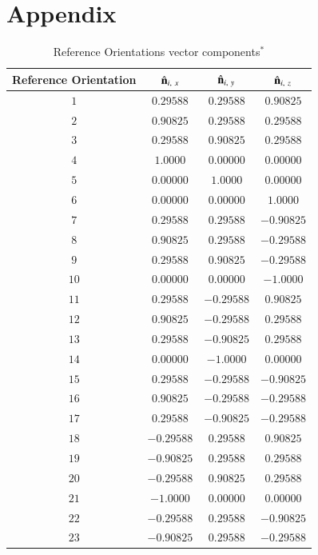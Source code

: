 \documentclass[final, 3p]{elsarticle}
\begin{document}
\section*{Appendix}
\setcounter{table}{0}
\renewcommand{\thetable}{A\arabic{table}}
\label{sec:App1}
\begin{table}[h]
\begin{center}
\caption{\label{tab:A1}
%
Reference Orientations vector components$^*$}
\begin{tabular}{|c|c|c|c|}
\hline\hline
Reference Orientation & $\hat{\bf n}_{i,\ x}$ &  $\hat{\bf n}_{i,\ y}$ &  $\hat{\bf n}_{i,\ z}$ \\
\hline
$1$ & $ 0.29588$ &  $ 0.29588$ & $ 0.90825$ \\
$2$ & $ 0.90825$ &  $ 0.29588$ & $ 0.29588$ \\
$3$ & $ 0.29588$ &  $ 0.90825$ & $ 0.29588$ \\
$4$ & $1.0000$ &  $0.00000$ & $0.00000$ \\
$5$ & $0.00000$ &  $1.0000$ & $0.00000$ \\
$6$ & $0.00000$ &  $0.00000$ & $1.0000$ \\
$7$ & $ 0.29588$ &  $ 0.29588$ & $-0.90825$ \\
$8$ & $ 0.90825$ &  $ 0.29588$ & $-0.29588$ \\
$9$ & $ 0.29588$ &  $ 0.90825$ & $-0.29588$ \\
$10$ & $0.00000$ &  $0.00000$ & $-1.0000$ \\
$11$ & $ 0.29588$ &  $-0.29588$ & $ 0.90825$ \\
$12$ & $ 0.90825$ &  $-0.29588$ & $ 0.29588$ \\
$13$ & $ 0.29588$ &  $-0.90825$ & $ 0.29588$ \\
$14$ & $0.00000$ &  $-1.0000$ & $0.00000$ \\
$15$ & $ 0.29588$ &  $-0.29588$ & $-0.90825$ \\
$16$ & $ 0.90825$ &  $-0.29588$ & $-0.29588$ \\
$17$ & $ 0.29588$ &  $-0.90825$ & $-0.29588$ \\
$18$ & $-0.29588$ &  $ 0.29588$ & $ 0.90825$ \\
$19$ & $-0.90825$ &  $ 0.29588$ & $ 0.29588$ \\
$20$ & $-0.29588$ &  $ 0.90825$ & $ 0.29588$ \\
$21$ & $-1.0000$ &  $0.00000$ & $0.00000$ \\
$22$ & $-0.29588$ &  $ 0.29588$ & $-0.90825$ \\
$23$ & $-0.90825$ &  $ 0.29588$ & $-0.29588$ \\

\end{tabular}
\end{center}
\end{table}
\end{document}
